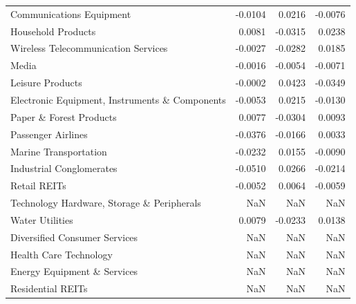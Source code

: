 \begin{table}
\begin{tabular}{lrrr}
Communications Equipment & -0.0104 & 0.0216 & -0.0076 \\
Household Products & 0.0081 & -0.0315 & 0.0238 \\
Wireless Telecommunication Services & -0.0027 & -0.0282 & 0.0185 \\
Media & -0.0016 & -0.0054 & -0.0071 \\
Leisure Products & -0.0002 & 0.0423 & -0.0349 \\
Electronic Equipment, Instruments \& Components & -0.0053 & 0.0215 & -0.0130 \\
Paper \& Forest Products & 0.0077 & -0.0304 & 0.0093 \\
Passenger Airlines & -0.0376 & -0.0166 & 0.0033 \\
Marine Transportation & -0.0232 & 0.0155 & -0.0090 \\
Industrial Conglomerates & -0.0510 & 0.0266 & -0.0214 \\
Retail REITs & -0.0052 & 0.0064 & -0.0059 \\
Technology Hardware, Storage \& Peripherals & NaN & NaN & NaN \\
Water Utilities & 0.0079 & -0.0233 & 0.0138 \\
Diversified Consumer Services & NaN & NaN & NaN \\
Health Care Technology & NaN & NaN & NaN \\
Energy Equipment \& Services & NaN & NaN & NaN \\
Residential REITs & NaN & NaN & NaN \\
\bottomrule
\end{tabular}
\end{table}
